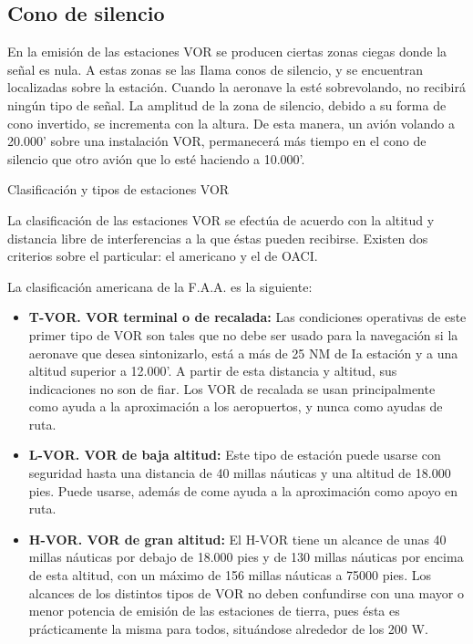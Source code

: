 \subsection*{Cono de silencio}

En la emisión de las estaciones VOR se producen ciertas zonas ciegas donde la señal es nula. A estas zonas se las Ilama conos de silencio, y se encuentran localizadas sobre la estación. Cuando la aeronave la esté sobrevolando, no recibirá ningún tipo de señal. La amplitud de la zona de silencio, debido a su forma de cono invertido, se incrementa con la altura. De esta manera, un avión volando a 20.000' sobre una instalación VOR, permanecerá más tiempo en el cono de silencio que otro avión que lo esté haciendo a 10.000'.

Clasificación y tipos de estaciones VOR

La clasificación de las estaciones VOR se efectúa de acuerdo con la altitud y distancia libre de interferencias a la que éstas pueden recibir­se. Existen dos criterios sobre el particular: el americano y el de OACI.

La clasificación americana de la F.A.A. es la siguiente:
\begin{itemize}
\item \textbf{T-VOR. VOR terminal o de recalada:} Las condiciones operativas de este primer tipo de VOR son tales que no debe ser usado para la navegación si la aeronave que desea sintonizar­lo, está a más de 25 NM de Ia estación y a una altitud superior a 12.000'. A partir de esta distancia y altitud, sus indicaciones no son de fiar.
Los VOR de recalada se usan principalmente como ayuda a la aproximación a los aeropuertos, y nunca como ayudas de ruta.


\item \textbf{L-VOR. VOR de baja altitud:}  Este tipo de estación puede usarse con seguridad hasta una distancia de 40 millas náuticas y una altitud de 18.000 pies. Puede usarse, además de come ayuda a la aproximación como apoyo en ruta.


\item \textbf{H-VOR. VOR de gran altitud:} El H-VOR tiene un alcance de unas 40 millas náuticas por debajo de 18.000 pies y de 130 millas náuticas por encima de esta altitud, con un máximo de 156 millas náuticas a  75000 pies. Los alcances de los distintos tipos de VOR no deben confundirse con una mayor o menor potencia de emisión de las estaciones de tierra, pues ésta es prácticamente la misma para todos, situándose alrededor de los 200 W. 

\end{itemize}


